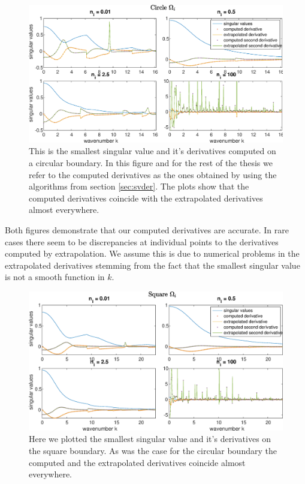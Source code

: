 \documentclass[a4paper, oneside]{discothesis}
\begin{document}
\begin{figure} [H]
	\centering
	\includegraphics[width=\columnwidth]{figures/derivatives_circle_refraction.eps}
	\caption{
		This is the smallest singular value and it's derivatives computed on a circular boundary.
		In this figure and for the rest of the thesis we refer to the computed derivatives as the ones obtained by using the algorithms from section \ref{sec:svder}.
		The plots show that the computed derivatives coincide with the extrapolated derivatives almost everywhere.
	}
	\label{fig:derivatives_circle_refraction}
\end{figure}
Both figures demonstrate that our computed derivatives are accurate.
In rare cases there seem to be discrepancies at individual points to the derivatives computed by extrapolation.
We assume this is due to numerical problems in the extrapolated derivatives stemming from the fact that the smallest singular value is not a smooth function in $k$.
\begin{figure} [H]
	\centering
	\includegraphics[width=\columnwidth]{figures/derivatives_square_refraction.eps}
	\caption{
		Here we plotted the smallest singular value and it's derivatives on the square boundary.
		As was the case for the circular boundary the computed and the extrapolated derivatives coincide almost everywhere.
	}
	\label{fig:derivatives_square_refraction}
\end{figure}
\end{document}
